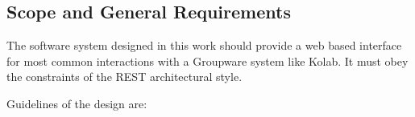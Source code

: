 \documentclass[12pt,a4paper]{scrartcl}		%
\begin{document}

\subsection{Scope and General Requirements}

The software system designed in this work should provide a web based interface
for most common interactions with a Groupware system like Kolab. It must obey
the constraints of the REST architectural style\cite{Fielding2000}.

Guidelines of the design are:
\end{document}
